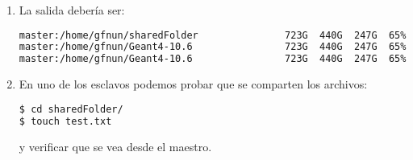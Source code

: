\begin{enumerate}
    \item La salida debería ser:
    
\begin{lstlisting}[language=bash,style=mystyle]    
master:/home/gfnun/sharedFolder               723G  440G  247G  65% /home/gfnun/sharedFolder
master:/home/gfnun/Geant4-10.6                723G  440G  247G  65% /home/gfnun/Geant4-10.6
master:/home/gfnun/Geant4-10.6                723G  440G  247G  65% /home/gfnun/Geant4-10.5
\end{lstlisting} 


    \item En uno de los esclavos podemos probar que se comparten los archivos:
    
\begin{lstlisting}[language=bash,style=mystyle]    
$ cd sharedFolder/
$ touch test.txt
\end{lstlisting} 

y verificar que se vea desde el maestro.


\end{enumerate}



\newpage
